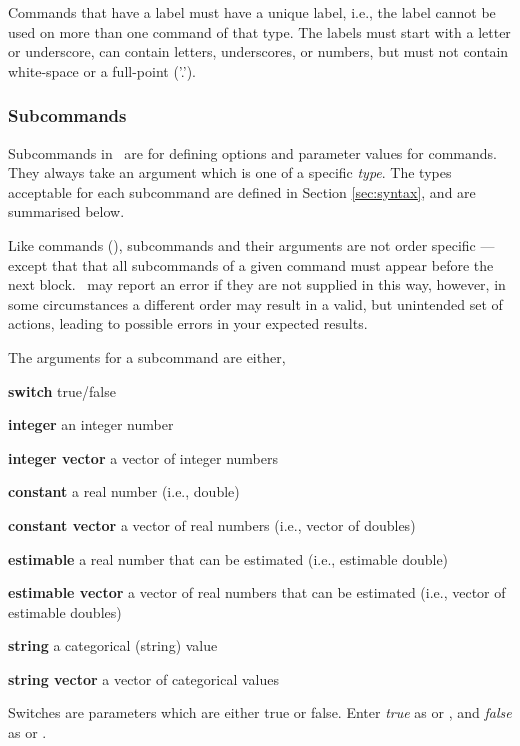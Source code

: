 Commands that have a label must have a unique label, i.e., the label cannot be used on more than one command of that type. The labels must start with a letter or underscore, can contain letters, underscores, or numbers, but must not contain white-space or a full-point ('.').

\subsubsection{Subcommands}

Subcommands in \SPM\ are for defining options and parameter values for commands. They always take an argument which is one of a specific \emph{type}. The types acceptable for each subcommand are defined in Section \ref{sec:syntax}, and are summarised below. 

Like commands (), subcommands and their arguments are not order specific --- except that that all subcommands of a given command must appear before the next  block. \SPM\ may report an error if they are not supplied in this way, however, in some circumstances a different order may result in a valid, but unintended set of actions, leading to possible errors in your expected results.  

The arguments for a subcommand are either,

\begin{description}
\item \textbf{switch} true/false 
\item \textbf{integer} an integer number
\item \textbf{integer vector} a vector of integer numbers
\item \textbf{constant} a real number (i.e., double)
\item \textbf{constant vector} a vector of real numbers (i.e., vector of doubles)
\item \textbf{estimable} a real number that can be estimated (i.e., estimable double)
\item \textbf{estimable vector} a vector of real numbers that can be estimated (i.e., vector of estimable doubles)
\item \textbf{string} a categorical (string) value
\item \textbf{string vector} a vector of categorical values
\end{description}

Switches are parameters which are either true or false. Enter \emph{true} as  or , and \emph{false} as  or . 

